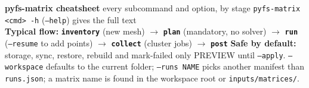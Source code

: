 \documentclass[a4paper,landscape]{article}
\newcommand{\fl}[1]{\textcolor{flag}{\texttt{#1}}}
\newcommand{\cmd}[1]{\textcolor{acc}{\textbf{\texttt{#1}}}}
\begin{document}
\fontsize{7.1}{8.1}\selectfont\raggedright
\begin{tcolorbox}[colback=acc!8,colframe=acc,boxrule=0.4pt,left=2pt,right=2pt,top=1pt,bottom=1pt]
{\large\bfseries\color{acc} pyfs-matrix cheatsheet} \hfill {\small \pkgname{} \textbf{\pkgversion} \quad every subcommand and option, by stage \quad \texttt{pyfs-matrix <cmd> -h} (\texttt{--help}) gives the full text}\\[1pt]
\textbf{Typical flow:} \cmd{inventory} (new mesh) $\rightarrow$ \cmd{plan} (mandatory, no solver) $\rightarrow$ \cmd{run} (\fl{--resume} to add points) $\rightarrow$ \cmd{collect} (cluster jobs) $\rightarrow$ \cmd{post} \quad\textbar\quad
\textbf{Safe by default:} storage, sync, restore, rebuild and mark-failed only PREVIEW until \fl{--apply}. \fl{--workspace} defaults to the current folder; \fl{--runs NAME} picks another manifest than \texttt{runs.json}; a matrix name is found in the workspace root or \texttt{inputs/matrices/}.
\end{tcolorbox}
\vspace{-2pt}
\end{document}
